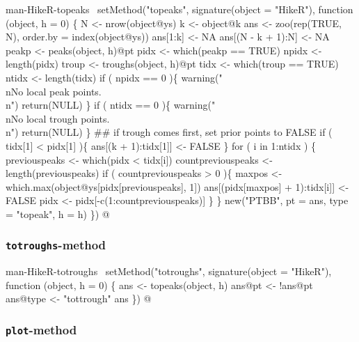 \documentclass[a4paper]{article}
\begin{document}
\nwenddocs{}\endmoddef
\LA{}man-HikeR-topeaks~{\nwtagstyle{}}\RA{}
setMethod("topeaks",
    signature(object = "HikeR"),
    function (object, h = 0) \{
        N <- nrow(object@ys)
        k <- object@k
        ans <- zoo(rep(TRUE, N), order.by = index(object@ys))
        ans[1:k] <- NA
        ans[(N - k + 1):N] <- NA
        peakp <- peaks(object, h)@pt
        pidx <- which(peakp == TRUE)
        npidx <- length(pidx)
        troup <- troughs(object, h)@pt
        tidx <- which(troup == TRUE)
        ntidx <- length(tidx)
        if ( npidx == 0 )\{
            warning("\\nNo local peak points.\\n")
            return(NULL)
        \}
        if ( ntidx == 0 )\{
            warning("\\nNo local trough points.\\n")
            return(NULL)
        \}
        ## if trough comes first, set prior points to FALSE
        if ( tidx[1] < pidx[1] )\{
            ans[(k + 1):tidx[1]] <- FALSE
        \}
        for ( i in 1:ntidx ) \{
            previouspeaks <- which(pidx < tidx[i])
            countpreviouspeaks <- length(previouspeaks)
            if ( countpreviouspeaks > 0 )\{
                maxpos <- which.max(object@ys[pidx[previouspeaks], 1])
                ans[(pidx[maxpos] + 1):tidx[i]] <- FALSE
                pidx <- pidx[-c(1:countpreviouspeaks)]
            \}
        \}
        new("PTBB", pt = ans, type = "topeak", h = h)
\})
\nwendcode{}@

\subsubsection{\texttt{totroughs}-method}

\nwenddocs{}\endmoddef
\LA{}man-HikeR-totroughs~{\nwtagstyle{}}\RA{}
setMethod("totroughs",
    signature(object = "HikeR"),
    function (object, h = 0) \{
        ans <- topeaks(object, h)
        ans@pt <- !ans@pt
        ans@type <- "tottrough"
        ans
\})
\nwendcode{}@

\subsubsection{\texttt{plot}-method}
\end{document}
